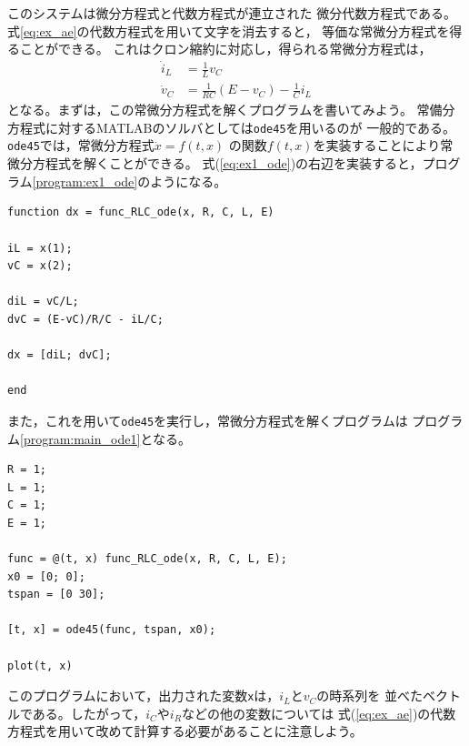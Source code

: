 \documentclass[tombow,dvipdfmx]{corona-a5-1.1}
\begin{document}
\begin{例}[簡単な例題]
このシステムは微分方程式と代数方程式が連立された
微分代数方程式である。
式\ref{eq:ex_ae}の代数方程式を用いて文字を消去すると，
等価な常微分方程式を得ることができる。
これはクロン縮約に対応し，得られる常微分方程式は，
\begin{subequations}\label{eq:ex1_ode}
  \begin{align}
    \dot{i}_L & = \frac{1}{L}v_C                     \\
    \dot{v}_C & = \frac{1}{RC}(E-v_C)-\frac{1}{C}i_L
  \end{align}
\end{subequations}
となる。まずは，この常微分方程式を解くプログラムを書いてみよう。
常備分方程式に対するMATLABのソルバとしては\verb|ode45|を用いるのが
一般的である。\verb|ode45|では，常微分方程式$\dot{x} = f(t, x)$
の関数$f(t, x)$を実装することにより常微分方程式を解くことができる。
式(\ref{eq:ex1_ode})の右辺を実装すると，プログラム\nobreak\ref{program:ex1_ode}のようになる。
\begin{PROGRAMA}[count,title={func\_RLC\_ode.m}]\label{program:ex1_ode}
  \begin{verbatim}
function dx = func_RLC_ode(x, R, C, L, E)

iL = x(1);
vC = x(2);

diL = vC/L;
dvC = (E-vC)/R/C - iL/C;

dx = [diL; dvC];

end
\end{verbatim}
\end{PROGRAMA}
また，これを用いて\verb|ode45|を実行し，常微分方程式を解くプログラムは
プログラム\nobreak\ref{program:main_ode1}となる。
\begin{PROGRAMA}[count,title={main\_RLC\_ode.m}]\label{program:main_ode1}
\begin{verbatim}
R = 1;
L = 1;
C = 1;
E = 1;

func = @(t, x) func_RLC_ode(x, R, C, L, E);
x0 = [0; 0];
tspan = [0 30];

[t, x] = ode45(func, tspan, x0);

plot(t, x)
\end{verbatim}
\end{PROGRAMA}
このプログラムにおいて，出力された変数\verb|x|は，$i_L$と$v_C$の時系列を
並べたベクトルである。したがって，$i_C$や$i_R$などの他の変数については
式(\ref{eq:ex_ae})の代数方程式を用いて改めて計算する必要があることに注意しよう。


\end{例}
\end{document}
